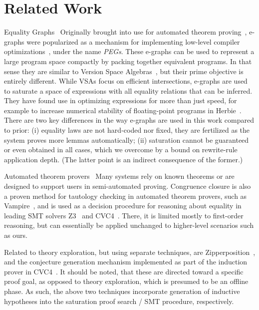\section{Related Work}
\label{thesy:related}

\begin{paragraph}{Equality Graphs}~
Originally brought into use for automated theorem proving~\cite{JACM2005:Detlefs},
e-graphs were popularized as a mechanism for implementing low-level compiler
optimizations~\cite{POPL2009:Tate}, under the name \emph{PEGs}.
These e-graphs can be used to represent a large
program space compactly by packing together equivalent programs.
In that sense they are similar to Version Space 
Algebras~\cite{ML2003:Programming}, but their prime objective is entirely
different.
While VSAs focus on efficient intersections, e-graphs are used to saturate a
space of expressions with all equality relations that can be inferred.
They have found use in optimizing expressions for more than just speed,
for example to increase numerical stability of floating-point programs
in Herbie~\cite{herbie}.
There are two key differences in the way e-graphs are used in this work compared
to prior:
(i) equality laws are not hard-coded nor fixed, they are fertilized
as the system proves more lemmas automatically;
(ii) saturation cannot be guaranteed or even obtained in all cases, which we overcome by a bound on rewrite-rule application depth.
(The latter point is an indirect consequence of the former.)
\end{paragraph}

\begin{paragraph}{Automated theorem provers}~
Many systems rely on known theorems or are designed to support users in semi-automated proving.
Congruence closure is also a proven method for tautology checking in
automated theorem provers, such as Vampire~\cite{vampire},
and is used as a decision procedure for reasoning about equality in leading SMT solvers
Z3~\cite{z3} and CVC4~\cite{cvc4}.
There, it is limited mostly to first-order reasoning, but can essentially
be applied unchanged to higher-level scenarios such as ours.

Related to theory exploration, but using separate techniques,
are Zipperposition~\cite{FroCoS2017:Cruanes}, and the conjecture generation mechanism implemented as part of
the induction prover in CVC4~\cite{cvc4induction}.
It should be noted, that these are directed toward a specific proof goal, as opposed to theory exploration, which is presumed to be an offline phase.
As such, the above two techniques incorporate generation of inductive hypotheses into the saturation proof search / SMT procedure, respectively.
\end{paragraph}

